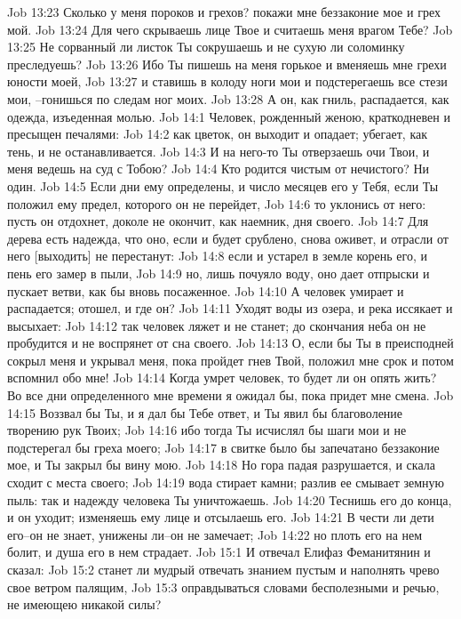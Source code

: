Job 13:23  Сколько у меня пороков и грехов? покажи мне беззаконие мое и грех мой.
Job 13:24  Для чего скрываешь лице Твое и считаешь меня врагом Тебе?
Job 13:25  Не сорванный ли листок Ты сокрушаешь и не сухую ли соломинку преследуешь?
Job 13:26  Ибо Ты пишешь на меня горькое и вменяешь мне грехи юности моей,
Job 13:27  и ставишь в колоду ноги мои и подстерегаешь все стези мои, --гонишься по следам ног моих.
Job 13:28  А он, как гниль, распадается, как одежда, изъеденная молью.
Job 14:1  Человек, рожденный женою, краткодневен и пресыщен печалями:
Job 14:2  как цветок, он выходит и опадает; убегает, как тень, и не останавливается.
Job 14:3  И на него-то Ты отверзаешь очи Твои, и меня ведешь на суд с Тобою?
Job 14:4  Кто родится чистым от нечистого? Ни один.
Job 14:5  Если дни ему определены, и число месяцев его у Тебя, если Ты положил ему предел, которого он не перейдет,
Job 14:6  то уклонись от него: пусть он отдохнет, доколе не окончит, как наемник, дня своего.
Job 14:7  Для дерева есть надежда, что оно, если и будет срублено, снова оживет, и отрасли от него [выходить] не перестанут:
Job 14:8  если и устарел в земле корень его, и пень его замер в пыли,
Job 14:9  но, лишь почуяло воду, оно дает отпрыски и пускает ветви, как бы вновь посаженное.
Job 14:10  А человек умирает и распадается; отошел, и где он?
Job 14:11  Уходят воды из озера, и река иссякает и высыхает:
Job 14:12  так человек ляжет и не станет; до скончания неба он не пробудится и не воспрянет от сна своего.
Job 14:13  О, если бы Ты в преисподней сокрыл меня и укрывал меня, пока пройдет гнев Твой, положил мне срок и потом вспомнил обо мне!
Job 14:14  Когда умрет человек, то будет ли он опять жить? Во все дни определенного мне времени я ожидал бы, пока придет мне смена.
Job 14:15  Воззвал бы Ты, и я дал бы Тебе ответ, и Ты явил бы благоволение творению рук Твоих;
Job 14:16  ибо тогда Ты исчислял бы шаги мои и не подстерегал бы греха моего;
Job 14:17  в свитке было бы запечатано беззаконие мое, и Ты закрыл бы вину мою.
Job 14:18  Но гора падая разрушается, и скала сходит с места своего;
Job 14:19  вода стирает камни; разлив ее смывает земную пыль: так и надежду человека Ты уничтожаешь.
Job 14:20  Теснишь его до конца, и он уходит; изменяешь ему лице и отсылаешь его.
Job 14:21  В чести ли дети его--он не знает, унижены ли--он не замечает;
Job 14:22  но плоть его на нем болит, и душа его в нем страдает.
Job 15:1  И отвечал Елифаз Феманитянин и сказал:
Job 15:2  станет ли мудрый отвечать знанием пустым и наполнять чрево свое ветром палящим,
Job 15:3  оправдываться словами бесполезными и речью, не имеющею никакой силы?
